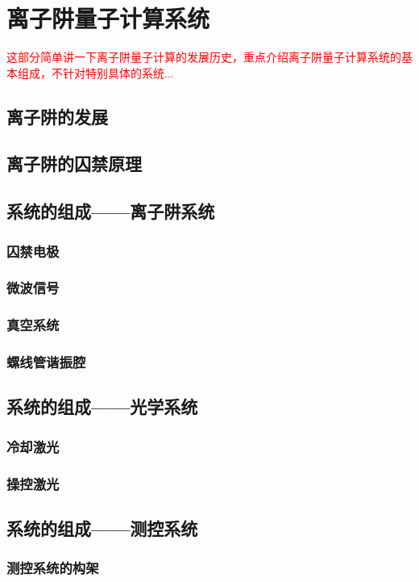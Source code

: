
\chapter[离子阱量子计算系统]{离子阱量子计算系统}

\textcolor{red}{\small
这部分简单讲一下离子阱量子计算的发展历史，重点介绍离子阱量子计算系统的基本组成，不针对特别具体的系统...
}

\section[离子阱的发展]{离子阱的发展}





\section[离子阱的囚禁原理]{离子阱的囚禁原理}


\section[系统的组成——离子阱系统]{系统的组成——离子阱系统}


\subsection[囚禁电极]{囚禁电极}


\subsection[微波信号]{微波信号}


\subsection[真空系统]{真空系统}


\subsection[螺线管谐振腔]{螺线管谐振腔}


\section[系统的组成——光学系统]{系统的组成——光学系统}

\subsection[冷却激光]{冷却激光}

\subsection[操控激光]{操控激光}

\section[系统的组成——测控系统]{系统的组成——测控系统}

\subsection[测控系统的构架]{测控系统的构架}

